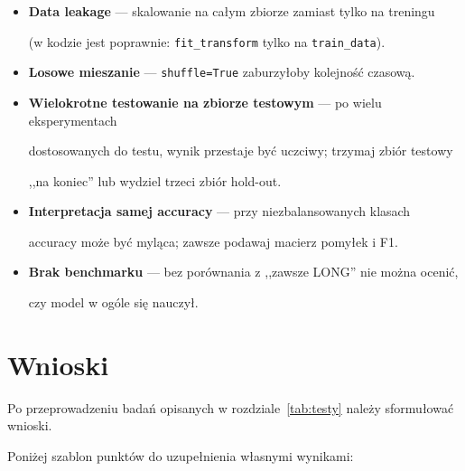 \documentclass[12pt,a4paper]{report}
\begin{document}
\begin{itemize}

    \item \textbf{Data leakage} --- skalowanie na całym zbiorze zamiast tylko na treningu

          (w kodzie jest poprawnie: \texttt{fit\_transform} tylko na \texttt{train\_data}).

    \item \textbf{Losowe mieszanie} --- \texttt{shuffle=True} zaburzyłoby kolejność czasową.

    \item \textbf{Wielokrotne testowanie na zbiorze testowym} --- po wielu eksperymentach

          dostosowanych do testu, wynik przestaje być uczciwy; trzymaj zbiór testowy

          ,,na koniec'' lub wydziel trzeci zbiór hold-out.

    \item \textbf{Interpretacja samej accuracy} --- przy niezbalansowanych klasach

          accuracy może być myląca; zawsze podawaj macierz pomyłek i F1.

    \item \textbf{Brak benchmarku} --- bez porównania z ,,zawsze LONG'' nie można ocenić,

          czy model w ogóle się nauczył.

\end{itemize}




\chapter{Wnioski}







Po przeprowadzeniu badań opisanych w rozdziale~\ref{tab:testy} należy sformułować wnioski.

Poniżej szablon punktów do uzupełnienia własnymi wynikami:
\end{document}
